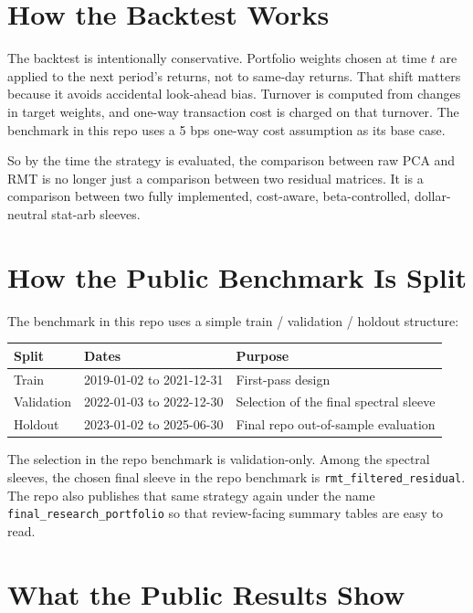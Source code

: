 \documentclass[11pt]{article}
\begin{document}
\section*{How the Backtest Works}

The backtest is intentionally conservative. Portfolio weights chosen at time
\(t\) are applied to the next period's returns, not to same-day returns. That
shift matters because it avoids accidental look-ahead bias. Turnover is computed
from changes in target weights, and one-way transaction cost is charged on that
turnover. The benchmark in this repo uses a 5 bps one-way cost assumption as its base
case.

So by the time the strategy is evaluated, the comparison between raw PCA and RMT
is no longer just a comparison between two residual matrices. It is a comparison
between two fully implemented, cost-aware, beta-controlled, dollar-neutral
stat-arb sleeves.

\section*{How the Public Benchmark Is Split}

The benchmark in this repo uses a simple train / validation / holdout structure:

\begin{center}
\begin{tabular}{lll}
\toprule
\textbf{Split} & \textbf{Dates} & \textbf{Purpose} \\
\midrule
Train & 2019-01-02 to 2021-12-31 & First-pass design \\
Validation & 2022-01-03 to 2022-12-30 & Selection of the final spectral sleeve \\
Holdout & 2023-01-02 to 2025-06-30 & Final repo out-of-sample evaluation \\
\bottomrule
\end{tabular}
\end{center}

The selection in the repo benchmark is validation-only. Among the spectral sleeves, the chosen
final sleeve in the repo benchmark is \texttt{rmt\_filtered\_residual}. The repo also
publishes that same strategy again under the name
\texttt{final\_research\_portfolio} so that review-facing summary tables are
easy to read.

\section*{What the Public Results Show}
\end{document}
